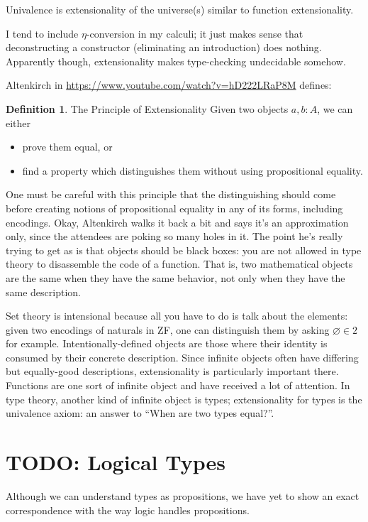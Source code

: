 \documentclass[11pt]{article} %
\theoremstyle{definition}
\newtheorem{definition}{Definition}
\theoremstyle{remark}
\begin{document}
Univalence is extensionality of the universe(s) similar to function extensionality.

I tend to include $\eta$-conversion in my calculi; it just makes sense that deconstructing a constructor (eliminating an introduction) does nothing. Apparently though, extensionality makes type-checking undecidable somehow.

Altenkirch in \url{https://www.youtube.com/watch?v=hD222LRaP8M} defines:
\begin{definition}{The Principle of Extensionality}
Given two objects $a, b : A$, we can either
\begin{itemize}
  \item prove them equal, or
  \item find a property which distinguishes them
        without using propositional equality.
\end{itemize}
One must be careful with this principle that the distinguishing should come before creating notions of propositional equality in any of its forms, including encodings.
Okay, Altenkirch walks it back a bit and says it's an approximation only, since the attendees are poking so many holes in it.
The point he's really trying to get as is that objects should be black boxes: you are not allowed in type theory to disassemble the code of a function.
That is, two mathematical objects are the same when they have the same behavior, not only when they have the same description.
\end{definition}
Set theory is intensional because all you have to do is talk about the elements: given two encodings of naturals in ZF, one can distinguish them by asking $\varnothing \in 2$ for example.
Intentionally-defined objects are those where their identity is consumed by their concrete description.
Since infinite objects often have differing but equally-good descriptions, extensionality is particularly important there.
Functions are one sort of infinite object and have received a lot of attention.
In type theory, another kind of infinite object is types; extensionality for types is the univalence axiom: an answer to ``When are two types equal?''.

\section{TODO: Logical Types}

Although we can understand types as propositions, we have yet to show an exact correspondence with the way logic handles propositions.
\end{document}
